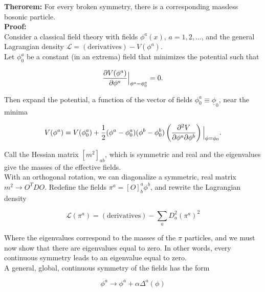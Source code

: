 \noindent \textbf{Therorem:} For every broken symmetry, there is a corresponding massless bosonic particle. \\

\noindent \textbf{Proof:} \\

\noindent Consider a classical field theory with fields $\phi^a (x)$, $a = 1, 2, \dots$, and the general Lagrangian density $\mathcal{L} = (\text{derivatives}) - V(\phi^a)$. \\

\noindent Let $\phi_0^a$ be a constant (in an extrema) field that minimizes the potential such that

\begin{equation}
\frac{\partial V(\phi^a)}{\partial \phi^a} \Big{|}_{\phi^a = \phi_0^a} = 0.
\end{equation}

\noindent Then expand the potential, a function of the vector of fields $\phi^a_0 \equiv \underline{\phi}_0$, near the minima

\begin{equation}
V(\phi^a) = V(\phi^a_0) + \frac{1}{2} (\phi^a - \phi_0^a) (\phi^b - \phi_0^b) \left( \frac{\partial^2 V}{\partial \phi^a \partial \phi^b} \right) \Big{|}_{\phi=\phi_0}.
\end{equation}

\noindent Call the Hessian matrix $[m^2]_{ab}$, which is symmetric and real and the eigenvalues give the masses of the effective fields. \\

\noindent With an orthogonal rotation, we can diagonalize a symmetric, real matrix $m^2 \rightarrow O^T D O$. Redefine the fields $\pi^a = [O]^a_b \phi^b$, and rewrite the Lagrangian density

\begin{equation}
\mathcal{L} (\pi^a) = (\text{derivatives}) - \sum_a D_a^2 (\pi^a)^2
\end{equation}

\noindent Where the eigenvalues correspond to the masses of the $\pi$ particles, and we must now show that there are eigenvalues equal to zero. In other words, every continuous symmetry leads to an eigenvalue equal to zero. \\

\noindent A general, global, continuous symmetry of the fields has the form

\begin{equation}
\phi^a \rightarrow \phi^a + \alpha \Delta^a (\phi)
\end{equation}

